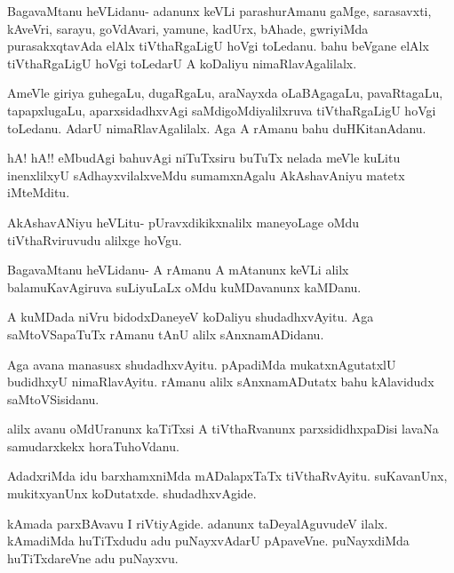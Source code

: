 \documentclass{article}
\begin{document}
\begin{mng}%
BagavaMtanu heVLidanu- adanunx keVLi parashurAmanu
gaMge, sarasavxti, kAveVri, sarayu, goVdAvari, yamune, kadUrx, bAhade,
gwriyiMda purasakxqtavAda elAlx tiVthaRgaLigU hoVgi toLedanu. bahu
beVgane elAlx tiVthaRgaLigU hoVgi toLedarU A koDaliyu
nimaRlavAgalilalx.
\end{mng}

\begin{mng}%
AmeVle giriya guhegaLu, dugaRgaLu, araNayxda oLaBAgagaLu,
pavaRtagaLu, tapapxlugaLu, aparxsidadhxvAgi saMdigoMdiyalilxruva tiVthaRgaLigU
hoVgi toLedanu. AdarU nimaRlavAgalilalx. Aga A rAmanu
bahu duHKitanAdanu.
\end{mng}

\begin{mng}%
hA! hA!! eMbudAgi bahuvAgi niTuTxsiru buTuTx nelada
meVle kuLitu inenxlilxyU sAdhayxvilalxveMdu sumamxnAgalu AkAshavAniyu
matetx iMteMditu.
\end{mng}

\begin{mng}%
AkAshavANiyu heVLitu- pUravxdikikxnalilx maneyoLage oMdu
tiVthaRviruvudu alilxge hoVgu.
\end{mng}

\begin{mng}%
BagavaMtanu heVLidanu- A rAmanu A mAtanunx keVLi alilx
balamuKavAgiruva suLiyuLaLx oMdu kuMDavanunx kaMDanu.
\end{mng}

\begin{mng}%
A kuMDada niVru bidodxDaneyeV koDaliyu shudadhxvAyitu.
Aga saMtoVSapaTuTx rAmanu tAnU alilx sAnxnamADidanu.
\end{mng}

\begin{mng}%
Aga avana manasusx shudadhxvAyitu. pApadiMda mukatxnAgutatxlU
budidhxyU nimaRlavAyitu. rAmanu alilx sAnxnamADutatx bahu 
kAlavidudx saMtoVSisidanu.
\end{mng}

\begin{mng}%
alilx avanu oMdUranunx kaTiTxsi A tiVthaRvanunx parxsididhxpaDisi
lavaNa samudarxkekx horaTuhoVdanu.
\end{mng}

\begin{mng}%
AdadxriMda idu barxhamxniMda mADalapxTaTx tiVthaRvAyitu. suKavanUnx,
mukitxyanUnx koDutatxde. shudadhxvAgide.
\end{mng}

\begin{mng}%
kAmada parxBAvavu I riVtiyAgide. adanunx taDeyalAguvudeV
ilalx. kAmadiMda huTiTxdudu adu puNayxvAdarU pApaveVne. puNayxdiMda
huTiTxdareVne adu puNayxvu.
\end{mng}
\end{document}
